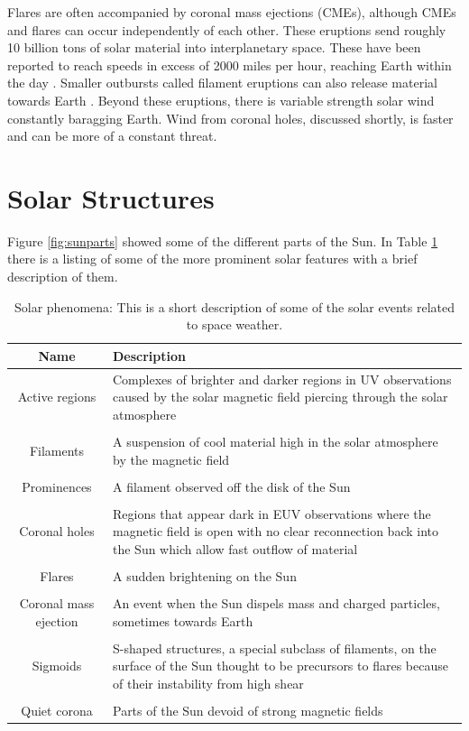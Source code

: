 \documentclass[twoside]{report}
\begin{document}
Flares are often accompanied by coronal mass ejections (CMEs), although CMEs and flares can occur independently of each other. These eruptions send roughly 10 billion tons of solar material into interplanetary space. These have been reported to reach speeds in excess of 2000 miles per hour, reaching Earth within the day \cite{fastcme}. Smaller outbursts called filament eruptions can also release material towards Earth \cite[p. 285]{langbook}. Beyond these eruptions, there is variable strength solar wind constantly baragging Earth. Wind from coronal holes, discussed shortly, is faster and can be more of a constant threat. 

\section{Solar Structures}\label{sec:solarstruct}
Figure \ref{fig:sunparts} showed some of the different parts of the Sun. In Table \ref{tab:solarfeatures} there is a listing of some of the more prominent solar features with a brief description of them. 

\begin{table}[ht!]
\centering
 \begin{tabular}{||c m{}||} 
 \hline
 Name & Description \\
   \hline\hline
   Active regions & Complexes of brighter and darker regions in UV observations caused by the solar magnetic field piercing through the solar atmosphere \\ \hline \\
   Filaments & A suspension of cool material high in the solar atmosphere by the magnetic field\\ \hline \\
   Prominences & A filament observed off the disk of the Sun \\ \hline \\
   Coronal holes & Regions that appear dark in EUV observations where the magnetic field is open with no clear reconnection back into the Sun which allow fast outflow of material \\ \hline \\
   Flares & A sudden brightening on the Sun \\ \hline \\
   Coronal mass ejection & An event when the Sun dispels mass and charged particles, sometimes towards Earth \\ \hline \\
   Sigmoids & S-shaped structures, a special subclass of filaments, on the surface of the Sun thought to be precursors to flares because of their instability from high shear  \\ \hline \\
   Quiet corona & Parts of the Sun devoid of strong magnetic fields \\ 
 \hline
 \end{tabular}
 \caption{Solar phenomena: This is a short description of some of the solar events related to space weather. }
 \label{tab:solarfeatures}
\end{table}
\end{document}
